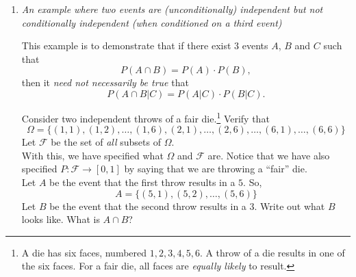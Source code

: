 \documentclass[12pt]{article}
\begin{document}
\begin{enumerate}
\item \emph{An example where two events are (unconditionally) independent but not conditionally independent (when conditioned on a third event)}\\

\par This example is to demonstrate that if there exist $3$ events $A$, $B$ and $C$ such that
\begin{equation}
P(A\cap B)=P(A)\cdot P(B),\nonumber
\end{equation}
then it \emph{need not necessarily be true} that
\begin{equation}
P(A\cap B|C)=P(A|C)\cdot P(B|C).\nonumber
\end{equation}

\par Consider two independent throws of a fair die.\footnote{A die has six faces, numbered $1,2,3,4,5,6$. A throw of a die results in one of the six faces. For a fair die, all faces are \emph{equally likely} to result.} Verify that 
\[
\Omega = \{(1,1), (1,2), \ldots, (1,6), (2,1), \ldots, (2,6), \ldots, (6,1), \ldots, (6,6)\}
\]
Let $\mathcal{F}$ be the set of \emph{all} subsets of $\Omega$.\\ With this, we have specified what $\Omega$ and $\mathcal{F}$ are. Notice that we have also specified $P:\mathcal{F}\to [0,1]$ by saying that we are throwing a ``fair'' die.\\

Let $A$ be the event that the first throw results in a $5$. So, 
\[
A = \{(5,1),(5,2),\ldots,(5,6)\}
\]
Let $B$ be the event that the second throw results in a $3$. Write out what $B$ looks like. What is $A \cap B$?\\


\end{enumerate}
\end{document}
